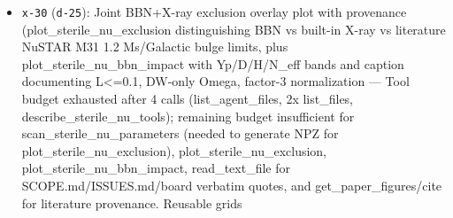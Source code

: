 \documentclass[11pt,a4paper]{article}
\begin{document}
\begin{itemize}
$$  \item \texttt{x-30} (\texttt{d-25}): Joint BBN+X-ray exclusion overlay plot with provenance (plot\_sterile\_nu\_exclusion distinguishing BBN vs built-in X-ray vs literature NuSTAR M31 1.2 Ms/Galactic bulge limits, plus plot\_sterile\_nu\_bbn\_impact with Yp/D/H/N\_eff bands and caption documenting L\textless{}=0.1, DW-only Omega, factor-3 normalization  --- Tool budget exhausted after 4 calls (list\_agent\_files, 2x list\_files, describe\_sterile\_nu\_tools); remaining budget insufficient for scan\_sterile\_nu\_parameters (needed to generate NPZ for plot\_sterile\_nu\_exclusion), plot\_sterile\_nu\_exclusion, plot\_sterile\_nu\_bbn\_impact, read\_text\_file for SCOPE.md/ISSUES.md/board verbatim quotes, and get\_paper\_figures/cite for literature provenance. Reusable grids 
\end{itemize}
\end{document}

